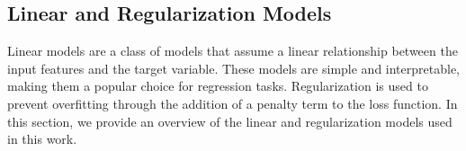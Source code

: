 \subsection{Linear and Regularization Models}
Linear models are a class of models that assume a linear relationship between the input features and the target variable.
These models are simple and interpretable, making them a popular choice for regression tasks.
Regularization is used to prevent overfitting through the addition of a penalty term to the loss function.
In this section, we provide an overview of the linear and regularization models used in this work.




